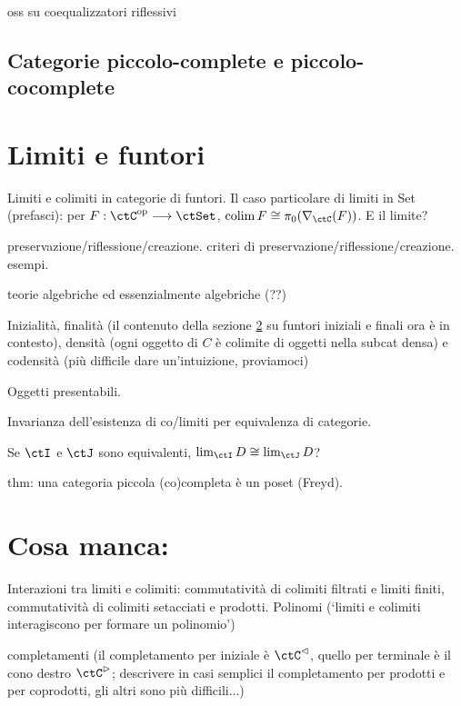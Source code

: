 oss su coequalizzatori riflessivi



\subsection{Categorie piccolo-complete e piccolo-cocomplete}

\section{Limiti e funtori}
Limiti e colimiti in categorie di funtori. Il caso particolare di limiti in Set (prefasci): per $F : \ctC^\op\fun\ctSet$, $\colim F\cong \pi_0(\Elts\ctC F)$. E il limite?

preservazione/riflessione/creazione. criteri di preservazione/riflessione/creazione. esempi.

teorie algebriche ed essenzialmente algebriche (??)


Inizialità, finalità (il contenuto della sezione \ref{} su funtori iniziali e finali ora è in contesto), densità (ogni oggetto di \(C\) è colimite di oggetti nella subcat densa) e codensità (più difficile dare un'intuizione, proviamoci)

Oggetti presentabili.

Invarianza dell'esistenza di co/limiti per equivalenza di categorie.

Se $\ctI$ e $\ctJ$ sono equivalenti, $\lim_\ctI D\cong\lim_\ctJ D$?

thm: una categoria piccola (co)completa è un poset (Freyd).

\section{Cosa manca:}




Interazioni tra limiti e colimiti: commutatività di colimiti filtrati e limiti finiti, commutatività di colimiti setacciati e prodotti. Polinomi (`limiti e colimiti interagiscono per formare un polinomio')

completamenti (il completamento per iniziale è \(\ctC^\lhd\), quello per terminale è il cono destro \(\ctC^\rhd\); descrivere in casi semplici il completamento per prodotti e per coprodotti, gli altri sono più difficili...)


